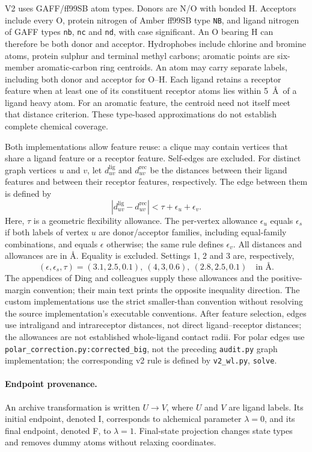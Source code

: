 \documentclass{article}
\begin{document}
V2 uses GAFF/ff99SB atom types. Donors are N/O with bonded H. Acceptors include every O, protein nitrogen of Amber ff99SB type \texttt{NB}, and ligand nitrogen of GAFF types \texttt{nb}, \texttt{nc} and \texttt{nd}, with case significant. An O bearing H can therefore be both donor and acceptor. Hydrophobes include chlorine and bromine atoms, protein sulphur and terminal methyl carbons; aromatic points are six-member aromatic-carbon ring centroids. An atom may carry separate labels, including both donor and acceptor for O--H. Each ligand retains a receptor feature when at least one of its constituent receptor atoms lies within 5~\AA\ of a ligand heavy atom. For an aromatic feature, the centroid need not itself meet that distance criterion. These type-based approximations do not establish complete chemical coverage.

Both implementations allow feature reuse: a clique may contain vertices that share a ligand feature or a receptor feature. Self-edges are excluded. For distinct graph vertices \(u\) and \(v\), let \(d^{\mathrm{lig}}_{uv}\) and \(d^{\mathrm{rec}}_{uv}\) be the distances between their ligand features and between their receptor features, respectively. The edge between them is defined by
\[
 |d^{\mathrm{lig}}_{uv}-d^{\mathrm{rec}}_{uv}|
 <\tau+\epsilon_u+\epsilon_v.
\]
Here, \(\tau\) is a geometric flexibility allowance. The per-vertex allowance \(\epsilon_u\) equals \(\epsilon_s\) if both labels of vertex \(u\) are donor/acceptor families, including equal-family combinations, and equals \(\epsilon\) otherwise; the same rule defines \(\epsilon_v\). All distances and allowances are in \AA. Equality is excluded. Settings 1, 2 and 3 are, respectively,
\[
 (\epsilon,\epsilon_s,\tau)
 =(3.1,2.5,0.1),\ (4,3,0.6),\ (2.8,2.5,0.1)
 \quad\text{in \AA}.
\]
The appendices of Ding and colleagues supply these allowances and the positive-margin convention; their main text prints the opposite inequality direction. The custom implementations use the strict smaller-than convention without resolving the source implementation's executable conventions. After feature selection, edges use intraligand and intrareceptor distances, not direct ligand--receptor distances; the allowances are not established whole-ligand contact radii.\cite{P} For polar edges use \texttt{polar\_correction.py:corrected\_big}, not the preceding \texttt{audit.py} graph implementation; the corresponding v2 rule is defined by \texttt{v2\_wl.py}, \texttt{solve}.

\paragraph{Endpoint provenance.}
An archive transformation is written \(U\to V\), where \(U\) and \(V\) are ligand labels. Its initial endpoint, denoted I, corresponds to alchemical parameter \(\lambda=0\), and its final endpoint, denoted F, to \(\lambda=1\). Final-state projection changes state types and removes dummy atoms without relaxing coordinates.
\end{document}
